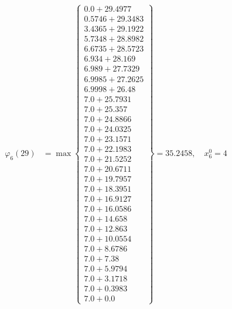\documentclass{article}
\begin{document}
\begin{align*}
\varphi_{6}(29) &= \max \left\{ \begin{array}{c}
0.0 + 29.4977 \\
 0.5746 + 29.3483 \\
 3.4365 + 29.1922 \\
 5.7348 + 28.8982 \\
 6.6735 + 28.5723 \\
 6.934 + 28.169 \\
 6.989 + 27.7329 \\
 6.9985 + 27.2625 \\
 6.9998 + 26.48 \\
 7.0 + 25.7931 \\
 7.0 + 25.357 \\
 7.0 + 24.8866 \\
 7.0 + 24.0325 \\
 7.0 + 23.1571 \\
 7.0 + 22.1983 \\
 7.0 + 21.5252 \\
 7.0 + 20.6711 \\
 7.0 + 19.7957 \\
 7.0 + 18.3951 \\
 7.0 + 16.9127 \\
 7.0 + 16.0586 \\
 7.0 + 14.658 \\
 7.0 + 12.863 \\
 7.0 + 10.0554 \\
 7.0 + 8.6786 \\
 7.0 + 7.38 \\
 7.0 + 5.9794 \\
 7.0 + 3.1718 \\
 7.0 + 0.3983 \\
 7.0 + 0.0
\end{array} \right\}=35.2458, \quad x_{6}^0=4\\
  

\end{align*}
\end{document}
